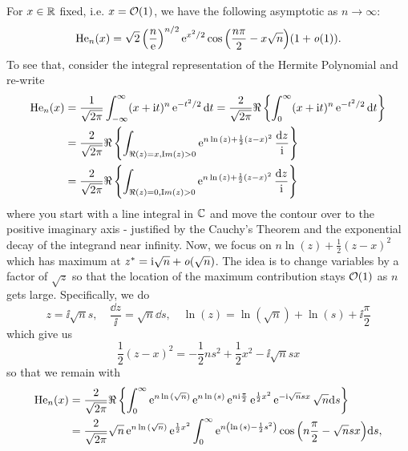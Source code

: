 \begin{exemplo} 	\label{Example: Hermite o(1)}
	\cite{nica2025gaussianintegralformulahermite}
	For $x \in \mathbb{R}$ fixed, i.e. $x = \mathcal{O}(1)$,  we have the following asymptotic as $n \rightarrow \infty$:
	\begin{equation}
		\mathrm{He}_n(x) = \sqrt{2} \left(\frac{n}{\operatorname{e}}\right)^{n/2} \operatorname{e}^{x^2/2} \cos{\left(\frac{n\pi}{2} - x \sqrt{n}\right)} (1 + \mathit{o}(1)).
	\end{equation}
	To see that, consider the integral representation of the Hermite Polynomial and re-write
	\begin{align}
		\mathrm{He}_n(x) & = \frac{1}{\sqrt{2\pi}} \int_{-\infty}^{\infty} (x + \mathrm{i} t)^n \operatorname{e}^{-t^2/2} \mathrm{d} t = \frac{2}{\sqrt{2\pi}} \Re\left\{ \int_{0}^{\infty} (x + \mathrm{i} t)^n \operatorname{e}^{-t^2/2} \mathrm{d} t \right\} \\
		& = \frac{2}{\sqrt{2\pi}} \Re\left\{ \int_{\Re(z) = x, \mathop{\textrm Im}(z)>0} \operatorname{e}^{n\ln{(z)} + \frac{1}{2}(z-x)^2} \frac{\mathrm{d} z}{\mathrm{i}} \right\} \\
		& = \frac{2}{\sqrt{2\pi}} \Re\left\{ \int_{\Re(z) = 0, \mathop{\textrm Im}(z)>0} \operatorname{e}^{n\ln{(z)} + \frac{1}{2}(z-x)^2} \frac{\mathrm{d} z}{\mathrm{i}} \right\}
	\end{align}
	where you start with a line integral in $\mathbb{C}$ and move the contour over to the positive imaginary axis - justified by the Cauchy's Theorem and the exponential decay of the integrand near infinity. Now, we focus on $n\ln{(z)} + \frac{1}{2}(z-x)^2$ which has maximum at $z^* = \mathrm{i} \sqrt{n} + \mathit{o}(\sqrt{n})$. The idea is to change variables by a factor of $\sqrt{z}$ so that the location of the maximum contribution stays $\mathcal{O}(1)$ as $n$ gets large. Specifically, we do
	\begin{equation}
		z = \ii \sqrt{n} s, \quad \frac{\dd z}{\ii} = \sqrt{n} \dd s, \quad \ln{(z)} = \ln{(\sqrt{n})} + \ln{(s)} + \ii \frac{\pi}{2}
	\end{equation}  
	which give us
	\begin{equation}
		\frac{1}{2}(z-x)^2 = -\frac{1}{2} ns^2 + \frac{1}{2} x^2 - \ii \sqrt{n} sx	
	\end{equation}
	so that we remain with
	\begin{align}
		\He_n(x) & = \frac{2}{\sqrt{2\pi}} \Re\left\{ \int_{0}^{\infty} \ee^{n\ln{(\sqrt{n})}} \ee^{n\ln{(s)}} \ee^{n\ii\frac{\pi}{2}} \ee^{\frac{1}{2}x^2}\ee^{-\ii\sqrt{n}sx} \sqrt{n} \dd s \right\} \\
		& = \frac{2}{\sqrt{2\pi}} \sqrt{n} \ee^{n\ln{(\sqrt{n})}} \ee^{\frac{1}{2}x^2}  \int_{0}^{\infty} \ee^{n\left(\ln{(s)} - \frac{1}{2}s^2 \right)} \cos{\left(n\frac{\pi}{2} - \sqrt{n} s x\right)} \dd s,

\end{align}
\end{exemplo}
